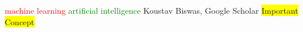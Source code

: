 \documentclass{article}
\begin{document}
	\textcolor{red}{machine learning}
	\textcolor{green}{artificial intelligence}
	\textcolor{mygreen}{Koustav Biswas, Google Scholar}
	\colorbox{yellow}{Important Concept}
\end{document}
